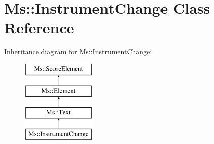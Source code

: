 \hypertarget{class_ms_1_1_instrument_change}{}\section{Ms\+:\+:Instrument\+Change Class Reference}
\label{class_ms_1_1_instrument_change}
Inheritance diagram for Ms\+:\+:Instrument\+Change\+:\begin{figure}[H]
\begin{center}
\leavevmode
\includegraphics[height=4.000000cm]{class_ms_1_1_instrument_change}
\end{center}
\end{figure}
